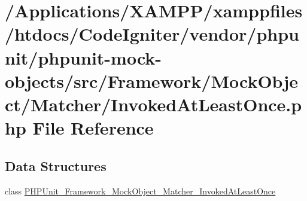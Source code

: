\hypertarget{_invoked_at_least_once_8php}{}\section{/\+Applications/\+X\+A\+M\+P\+P/xamppfiles/htdocs/\+Code\+Igniter/vendor/phpunit/phpunit-\/mock-\/objects/src/\+Framework/\+Mock\+Object/\+Matcher/\+Invoked\+At\+Least\+Once.php File Reference}
\label{_invoked_at_least_once_8php}
\subsection*{Data Structures}
\begin{DoxyCompactItemize}
\item 
class \mbox{\hyperlink{class_p_h_p_unit___framework___mock_object___matcher___invoked_at_least_once}{P\+H\+P\+Unit\+\_\+\+Framework\+\_\+\+Mock\+Object\+\_\+\+Matcher\+\_\+\+Invoked\+At\+Least\+Once}}
\end{DoxyCompactItemize}
